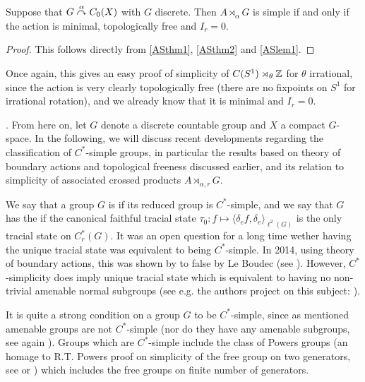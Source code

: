\begin{corollary}
	Suppose that $G \stackrel{\alpha}{\curvearrowright} C_0(X)$ with $G$ discrete. Then $A \rtimes_\alpha G$ is simple if and only if the action is minimal, topologically free and $I_r = 0$.
\end{corollary}
\begin{proof}
	This follows directly from \cref{ASthm1}, \cref{ASthm2} and \cref{ASlem1}.
\end{proof}
Once again, this gives an easy proof of simplicity of $C(S^1) \rtimes_{\theta} \mathbb{Z}$ for $\theta$ irrational, since the action is very clearly topologically free (there are no fixpoints on $S^1$ for irrational rotation), and we already know that it is minimal and $I_r = 0$.

.
From here on, let $G$ denote a discrete countable group and $X$ a compact $G$-space. In the following, we will discuss recent developments regarding the classification of $C^*$-simple groups, in particular the results based on theory of boundary actions and topological freeness discussed earlier, and its relation to simplicity of associated crossed products $A \rtimes_{\alpha,r} G$. 

We say that a group $G$ is  if its reduced group is $C^*$-simple, and we say that $G$ has the  if the canonical faithful tracial state $\tau_0 \colon f \mapsto \langle \delta_e f , \delta_e\rangle_{\ell^2(G)}$ is the only tracial state on $C_r^*(G)$. It was an open question for a long time wether having the unique tracial state was equivalent to being $C^*$-simple. In 2014, using theory of boundary actions, this was shown by to false by Le Boudec (see \cite[Thoerem A]{le2017c}). However, $C^*$-simplicity does imply unique tracial state which is equivalent to having no non-trivial amenable normal subgroups (see e.g. the authors project on this subject: \cite[Chapter 5]{bscp}).

It is quite a strong condition on a group $G$ to be $C^*$-simple, since as mentioned amenable groups are not $C^*$-simple (nor do they have any amenable subgroups, see again \cite[Chapter 5]{bscp}). Groups which are $C^*$-simple include the class of Powers groups (an homage to R.T. Powers proof on simplicity of the free group on two generators, see \cite{powers1975simplicity} or \cite[chapter 3]{bscp}) which includes the free groups on finite number of generators.

